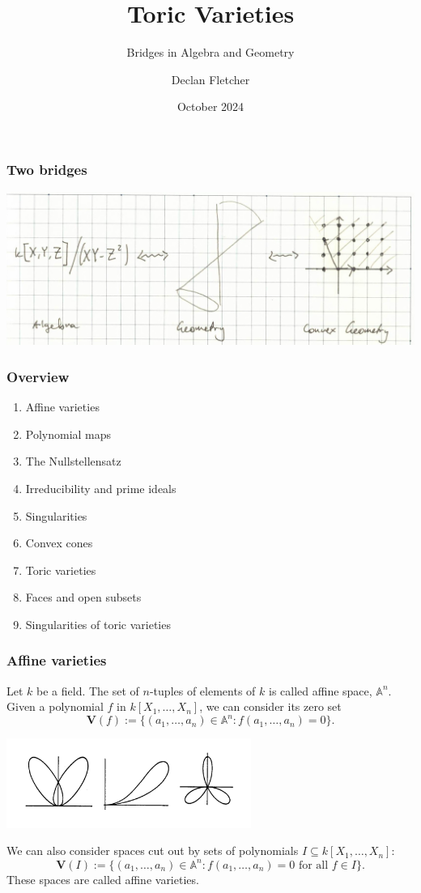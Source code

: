 \documentclass{beamer}
\title{Toric Varieties}
\subtitle{Bridges in Algebra and Geometry}
\author{Declan Fletcher}
\date{October 2024}
\theoremstyle{definition}
\theoremstyle{definition}
\begin{document}
\begin{frame}
\titlepage
\end{frame}

\begin{frame}
\frametitle{Two bridges}
\includegraphics[width=\textwidth]{ring_variety_cone}
\end{frame}

\begin{frame}
\frametitle{Overview}
\centering
\begin{enumerate}
\item Affine varieties
\item Polynomial maps
\item The Nullstellensatz
\item Irreducibility and prime ideals
\item Singularities
\item Convex cones
\item Toric varieties
\item Faces and open subsets
\item Singularities of toric varieties
\end{enumerate}
\end{frame}

\begin{frame}
\frametitle{Affine varieties}
Let $k$ be a field.
The set of $n$-tuples of elements of $k$ is called affine space, $\mathbb{A}^n$.
Given a polynomial $f$ in $k[X_1, \ldots, X_n]$, we can consider its zero set
$$\mathbf{V}(f) := \{(a_1, \ldots, a_n) \in \mathbb{A}^n : f(a_1, \ldots, a_n) = 0\}.$$
\centerline{\includegraphics[width=0.6\textwidth]{milne_three_curves}}
We can also consider spaces cut out by sets of polynomials $I \subseteq k[X_1,\ldots,X_n]$: 
$$\mathbf{V}(I):=\{(a_1, \ldots, a_n) \in \mathbb{A}^n : f(a_1, \ldots, a_n) = 0 \text{ for all } f \in I\}.$$
These spaces are called \alert{affine varieties}.
\end{frame}
\end{document}
